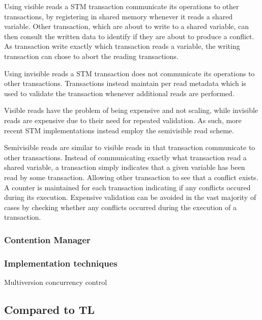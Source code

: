 Using visible reads a \ac{STM} transaction communicate its operations to other transactions, by registering in shared memory whenever it reads a shared variable\cite[p. 2]{lev2009anatomy}\cite[p. 2085]{herlihy2011tm}. Other transaction, which are about to write to a shared variable, can then consult the written data to identify if they are about to produce a conflict. As transaction write exactly which transaction reads a variable, the writing transaction can chose to abort the reading transactions\cite[p. 2]{lev2009anatomy}.

Using invisible reads a \ac{STM} transaction does not communicate its operations to other transactions\cite[p. 114]{imbs2012virtual}. Transactions instead maintain per read metadata which is used to validate the transaction whenever additional reads are performed\cite[p. 2085]{herlihy2011tm}.

Visible reads have the problem of being expensive and not scaling, while invisible reads are expensive due to their need for repeated validation. As such, more recent \ac{STM} implementations instead employ the semivisible read scheme\cite[p. 2085]{herlihy2011tm}.

Semivisible reads are similar to visible reads in that transaction communicate to other transactions. Instead of communicating exactly what transaction read a shared variable, a transaction simply indicates that a given variable has been read by some transaction. Allowing other transaction to see that a conflict exists. A counter is maintained for each transaction indicating if any conflicts occured during its execution. Expensive validation can be avoided in the vast majority  of cases by checking whether any conflicts occurred during the execution of a transaction\cite[p. 2]{lev2009anatomy}.

\subsubsection{Contention Manager}
\subsubsection{Implementation techniques}
Multiversion concurrency control\\


\subsection{Compared to TL}

